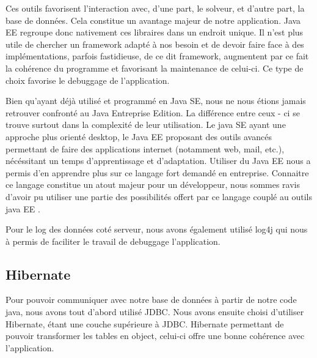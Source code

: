 Ces outils favorisent l'interaction avec, d'une part, le solveur, et d'autre part, la base de données. Cela constitue un avantage majeur de notre application. Java EE regroupe donc nativement ces libraires dans un endroit unique. Il n'est plus utile de chercher un framework adapté à nos besoin et de devoir faire face à des implémentations, parfois fastidieuse, de ce dit framework, augmentent par ce fait la cohérence du programme et favorisant la maintenance de celui-ci. Ce type de choix favorise le debuggage de l'application.

Bien qu'ayant déjà utilisé et programmé en Java SE, nous ne nous étions jamais retrouver confronté au Java Entreprise Edition. La différence entre ceux - ci se trouve surtout dans la complexité de leur utilisation. Le java SE ayant une approche plus orienté desktop, le Java EE proposant des outils avancés permettant de faire des applications internet (notamment web, mail, etc.), nécéssitant un temps d'apprentissage et d'adaptation. Utiliser du Java EE nous a permis d'en apprendre plus sur ce langage fort demandé en entreprise. Connaitre ce langage constitue un atout majeur pour un développeur, nous sommes ravis d'avoir pu utiliser une partie des possibilités offert par ce langage couplé au outils java EE .

Pour le log des données coté serveur, nous avons également utilisé log4j qui nous à permis de faciliter le travail de debuggage l'application.

\subsection{Hibernate}

Pour pouvoir communiquer avec notre base de données à partir de notre code java, nous avons tout d'abord utilisé JDBC. Nous avons ensuite choisi d'utiliser Hibernate, étant une couche supérieure à JDBC. Hibernate permettant de pouvoir transformer les tables en object, celui-ci offre une bonne cohérence avec l'application.

